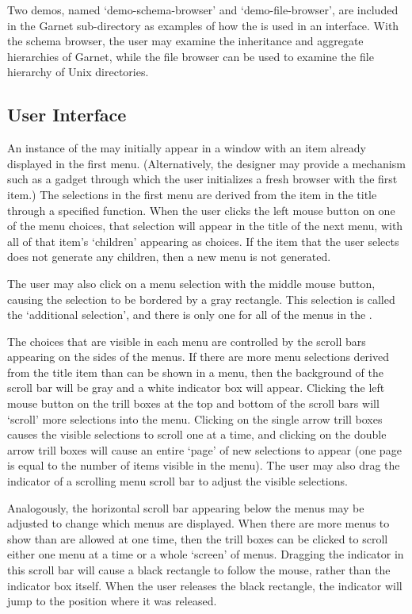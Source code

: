  Two demos, named `demo-schema-browser' and
`demo-file-browser', are included in the Garnet 
sub-directory as examples of how the  is used in an
interface.  With the schema browser, the user may examine the
inheritance and aggregate hierarchies of Garnet, while the file
browser can be used to examine the file hierarchy of Unix directories.

\subsection{User Interface} An instance of the  may
initially appear in a window with an item already displayed in the
first menu.  (Alternatively, the designer may provide a mechanism such
as a  gadget through which the user initializes a
fresh browser with the first item.)  The selections in the first menu
are derived from the item in the title through a specified function.
When the user clicks the left mouse button on one of the menu choices,
that selection will appear in the title of the next menu, with all of
that item's `children' appearing as choices.  If the item that the
user selects does not generate any children, then a new menu is not
generated.

The user may also click on a menu selection with the middle mouse
button, causing the selection to be bordered by a gray rectangle.
This selection is called the `additional selection', and there is only
one for all of the menus in the .

The choices that are visible in each menu are controlled by the scroll
bars appearing on the sides of the menus.  If there are more menu
selections derived from the title item than can be shown in a menu,
then the background of the scroll bar will be gray and a white
indicator box will appear.  Clicking the left mouse button on the
trill boxes at the top and bottom of the scroll bars will `scroll'
more selections into the menu.  Clicking on the single arrow trill
boxes causes the visible selections to scroll one at a time, and
clicking on the double arrow trill boxes will cause an entire `page'
of new selections to appear (one page is equal to the number of items
visible in the menu).  The user may also drag the indicator of a
scrolling menu scroll bar to adjust the visible selections.

Analogously, the horizontal scroll bar appearing below the menus may
be adjusted to change which menus are displayed.  When there are more
menus to show than are allowed at one time, then the trill boxes can
be clicked to scroll either one menu at a time or a whole `screen' of
menus.  Dragging the indicator in this scroll bar will cause a black
rectangle to follow the mouse, rather than the indicator box itself.
When the user releases the black rectangle, the indicator will jump to
the position where it was released.

